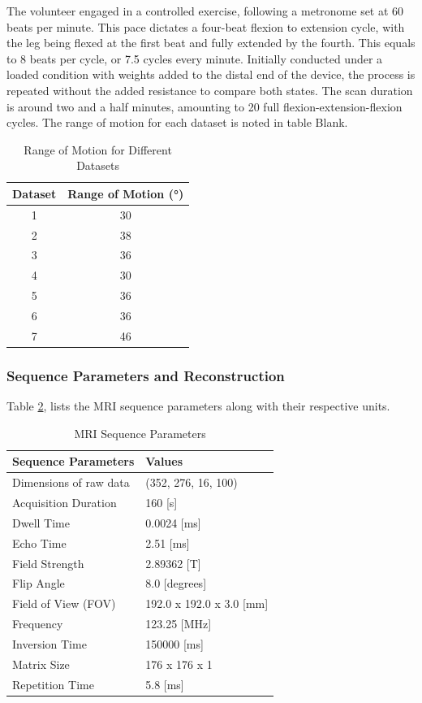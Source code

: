 \documentclass{micro-econ-thesis}
\begin{document}
The volunteer engaged in a controlled exercise, following a metronome set at 60 beats per minute. This pace dictates a four-beat flexion to extension cycle, with the leg being flexed at the first beat and fully extended by the fourth. This equals to 8 beats per cycle, or 7.5 cycles every minute. Initially conducted under a loaded condition with weights added to the distal end of the device, the process is repeated without the added resistance to compare both states. The scan duration is around two and a half minutes, amounting to 20 full flexion-extension-flexion cycles. The range of motion for each dataset is noted in table Blank. 

\begin{table}[H]
	\centering
	\label{tab:range_of_motion}
	\caption{Range of Motion for Different Datasets}
	\begin{tabular}{cc}
		\toprule
		Dataset & Range of Motion (°) \\
		\midrule
		1 & 30 \\
		2 & 38 \\
		3 & 36 \\
		4 & 30 \\
		5 & 36 \\
		6 & 36 \\
		7 & 46 \\
		\bottomrule
	\end{tabular}
	
	
\end{table}

\subsubsection{Sequence Parameters and Reconstruction}
Table \ref{tab:mri_seq_params}, lists the MRI sequence parameters along with their respective units.

\begin{table}[H]
	\centering
	\label{tab:mri_seq_params}
	\caption{MRI Sequence Parameters}
	\begin{tabular}{@{}ll@{}}
		\toprule
		Sequence Parameters & Values \\ \midrule
		Dimensions of raw data & (352, 276, 16, 100) \\
		Acquisition Duration & 160 [s] \\
		Dwell Time & 0.0024 [ms] \\
		Echo Time & 2.51 [ms] \\
		Field Strength & 2.89362 [T] \\
		Flip Angle & 8.0 [degrees] \\
		Field of View (FOV) & 192.0 x 192.0 x 3.0 [mm] \\
		Frequency & 123.25 [MHz] \\
		Inversion Time & 150000 [ms] \\
		Matrix Size & 176 x 176 x 1 \\
		Repetition Time & 5.8 [ms] \\
		\bottomrule
	\end{tabular}
\end{table}
\end{document}
